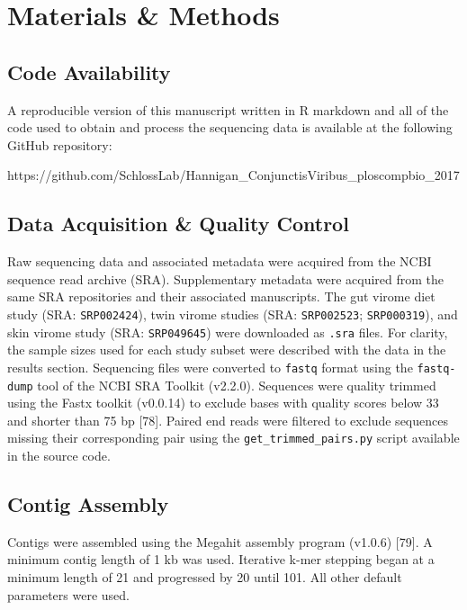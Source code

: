 \documentclass[12pt,]{article}
\begin{document}
\section{Materials \& Methods}\label{materials-methods}

\subsection{Code Availability}\label{code-availability}

A reproducible version of this manuscript written in R markdown and all
of the code used to obtain and process the sequencing data is available
at the following GitHub repository:

https://github.com/SchlossLab/Hannigan\_ConjunctisViribus\_ploscompbio\_2017

\subsection{Data Acquisition \& Quality
Control}\label{data-acquisition-quality-control}

Raw sequencing data and associated metadata were acquired from the NCBI
sequence read archive (SRA). Supplementary metadata were acquired from
the same SRA repositories and their associated manuscripts. The gut
virome diet study (SRA: \texttt{SRP002424}), twin virome studies (SRA:
\texttt{SRP002523}; \texttt{SRP000319}), and skin virome study (SRA:
\texttt{SRP049645}) were downloaded as \texttt{.sra} files. For clarity,
the sample sizes used for each study subset were described with the data
in the results section. Sequencing files were converted to
\texttt{fastq} format using the \texttt{fastq-dump} tool of the NCBI SRA
Toolkit (v2.2.0). Sequences were quality trimmed using the Fastx toolkit
(v0.0.14) to exclude bases with quality scores below 33 and shorter than
75 bp {[}78{]}. Paired end reads were filtered to exclude sequences
missing their corresponding pair using the
\texttt{get\_trimmed\_pairs.py} script available in the source code.

\subsection{Contig Assembly}\label{contig-assembly}

Contigs were assembled using the Megahit assembly program (v1.0.6)
{[}79{]}. A minimum contig length of 1 kb was used. Iterative k-mer
stepping began at a minimum length of 21 and progressed by 20 until 101.
All other default parameters were used.
\end{document}
